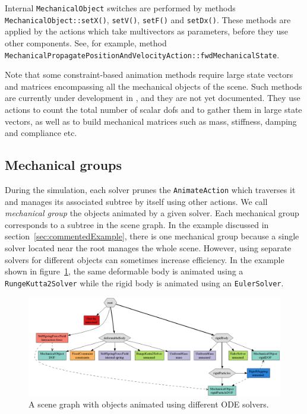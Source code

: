 Internal  \texttt{MechanicalObject} switches are performed by methods \texttt{MechanicalObject::setX()}, \texttt{setV()}, \texttt{setF()} and  \texttt{setDx()}. 
These methods are applied by the actions which take multivectors as parameters, before they use other components. See, for example, method\\ \texttt{MechanicalPropagatePositionAndVelocityAction::fwdMechanicalState}.

Note that some constraint-based animation methods require large state vectors and matrices encompassing all the mechanical objects of the scene.
Such methods are currently under development in \sofa, and they are not yet documented.
They use actions to count the total number of scalar dofs and to gather them in large state vectors, as well as to build mechanical matrices  such as mass, stiffness, damping and compliance etc.

\subsection{Mechanical groups}
During the simulation, each solver prunes the \texttt{AnimateAction} which traverses it and manages its associated subtree by itself using other actions. 
We call \emph{mechanical group} the objects animated by a given solver.
Each mechanical group corresponds to a subtree in the scene graph.
In the example discussed in section~\ref{sec:commentedExample}, there is one mechanical group because a single solver located near the root manages the whole scene. 
However, using separate solvers for different objects can sometimes increase efficiency.
In the example shown in figure~\ref{fig:twoSolvers}, the same deformable body is animated using a \texttt{RungeKutta2Solver} while the rigid body is animated using an \texttt{EulerSolver}.
\begin{figure}
 \centering
 \includegraphics[width=0.95\linewidth]{twoSolvers}
  \caption{A scene graph with objects animated using different ODE solvers.}
 \label{fig:twoSolvers}
\end{figure}


